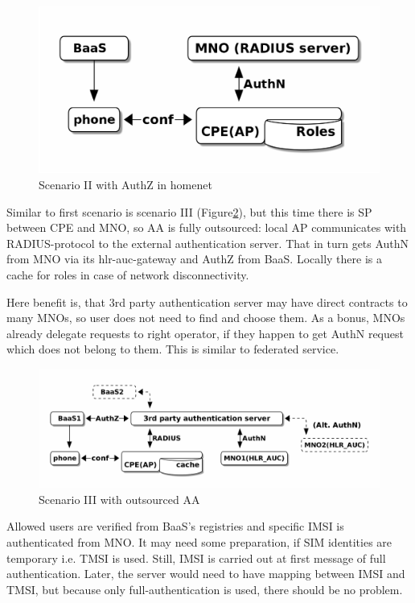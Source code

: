\documentclass[12pt,a4paper,english]{tutthesis}
\begin{document}
\begin{figure}[htb]
\centering
\includegraphics[width=.9\linewidth]{scenII.png}
\caption{\label{fig:scenario-II}Scenario II with AuthZ in homenet}
\end{figure}


\label{scenario-iii}

Similar to first scenario is scenario III (Figure\ref{fig:scenario-III}), 
but this time there is SP between CPE and MNO, so AA is fully outsourced:
local AP communicates with RADIUS-protocol to the external
authentication server. That in turn gets AuthN from MNO via its
hlr-auc-gateway and AuthZ from BaaS.
Locally there is a cache for roles in case of network disconnectivity.

Here benefit is, that 3rd party authentication server may have direct
contracts to many MNOs, so user does not need to find and choose
them. As a bonus,  MNOs already delegate requests to right operator, if
they happen to get AuthN request which does not belong to them.
This is similar to federated service.

\begin{figure}[htb]
\centering
\includegraphics[width=.9\linewidth]{scenIII.png}
\caption{\label{fig:scenario-III}Scenario III with outsourced AA}
\end{figure}

Allowed users are verified from BaaS's registries and specific IMSI is
authenticated from MNO.  It may need some preparation, if SIM
identities are temporary i.e. TMSI is used.  Still, IMSI is carried out at first message
of full authentication. Later, the server would need to have mapping
between IMSI and TMSI, but because only full-authentication is used,
there should be no problem.
\end{document}
